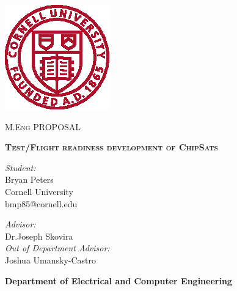 \documentclass[a4, 12pt]{article}
\begin{document}
\begin{titlepage}

\begin{center}
   \includegraphics[scale=1.6]{Images/bold_cornell_seal_pms187_red.eps} 
\end{center}
   
\thispagestyle{fancy}

\center

\textsc{\large M.Eng PROPOSAL}

\vspace{0.5in}

\noindent\makebox[\linewidth]{\rule{\linewidth}{1.2pt}}
\textsc{ \textbf{\large Test/Flight readiness development of ChipSats}}
\noindent\makebox[\linewidth]{\rule{\linewidth}{1.2pt}}

\vspace{0.5in}

\begin{minipage}{0.48\textwidth}
    \begin{flushleft}
        \textit{Student:} \\
        Bryan Peters \\
        Cornell University \\
        bmp85@cornell.edu
    \end{flushleft}
\end{minipage}
\begin{minipage}{0.48\textwidth}
    \begin{flushright}
    \textit{Advisor:} \\
    Dr.Joseph Skovira \\
    \textit{Out of Department Advisor:}\\
    Joshua Umansky-Castro\\
    \end{flushright}
\end{minipage}

\vspace{2in}

\textbf{\large Department of Electrical and Computer Engineering} \\

\thispagestyle{empty}
\end{titlepage}
\end{document}
